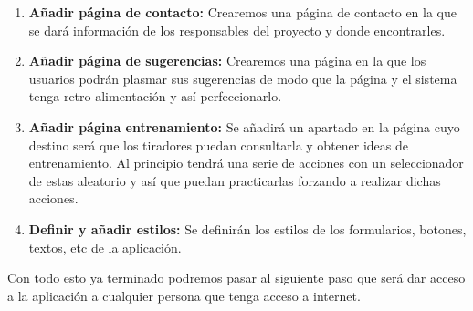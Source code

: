 \begin{enumerate}
  \item \textbf{Añadir página de contacto:} Crearemos una página de contacto en la que
    se dará información de los responsables del proyecto y donde encontrarles.

  \item \textbf{Añadir página de sugerencias:} Crearemos una página en la que los usuarios
    podrán plasmar sus sugerencias de modo que la página y el sistema tenga retro-alimentación
    y así perfeccionarlo.

  \item \textbf{Añadir página entrenamiento:} Se añadirá un apartado en la página cuyo destino
    será que los tiradores puedan consultarla y obtener ideas de entrenamiento. Al principio
    tendrá una serie de acciones con un seleccionador de estas aleatorio y así que puedan
    practicarlas forzando a realizar dichas acciones.

  \item \textbf{Definir y añadir estilos:} Se definirán los estilos de los formularios, botones,
    textos, etc de la aplicación.
\end{enumerate}

Con todo esto ya terminado podremos pasar al siguiente paso que será
dar acceso a la aplicación a cualquier persona que tenga acceso a internet.
